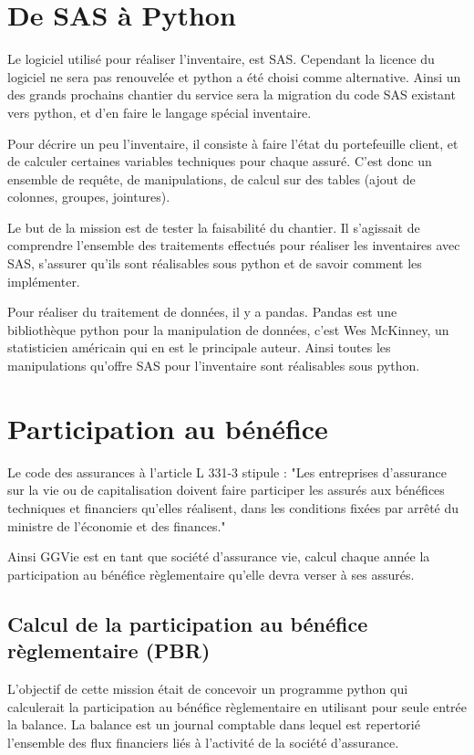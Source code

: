 \chapter{De SAS à Python}

Le logiciel utilisé pour réaliser l'inventaire, est SAS. Cependant la licence du logiciel ne sera pas renouvelée et python a été choisi comme alternative. Ainsi un des grands prochains chantier du service sera la migration du code SAS existant vers python, et d'en faire le langage spécial inventaire.

Pour décrire un peu l'inventaire, il consiste à faire l'état du portefeuille client, et de calculer certaines variables techniques pour chaque assuré. C'est donc un ensemble de requête, de manipulations, de calcul sur des tables (ajout de colonnes, groupes, jointures). 

Le but de la mission est de tester la faisabilité du chantier. Il s’agissait de comprendre l’ensemble des traitements effectués pour réaliser les inventaires avec SAS, s'assurer qu'ils sont réalisables sous python et de savoir comment les implémenter. 

Pour réaliser du traitement de données, il y a pandas. Pandas est une bibliothèque python pour la manipulation de données, c'est Wes McKinney, un statisticien américain qui en est le principale auteur. Ainsi toutes les manipulations qu'offre SAS pour l'inventaire sont réalisables sous python.


\chapter{Participation au bénéfice}

Le code des assurances à l'article L 331-3 stipule :
"Les entreprises d'assurance sur la vie ou de capitalisation doivent faire participer les assurés aux bénéfices techniques et financiers qu'elles réalisent, dans les conditions fixées par arrêté du ministre de l'économie et des finances."

Ainsi GGVie est en tant que société d'assurance vie, calcul chaque année la participation au bénéfice règlementaire qu'elle devra verser à ses assurés.

\section{Calcul de la participation au bénéfice règlementaire (PBR)}

L'objectif de cette mission était de concevoir un programme python qui calculerait la participation au bénéfice règlementaire en utilisant pour seule entrée la balance.
La balance est un journal comptable dans lequel est repertorié l'ensemble des flux financiers liés à l'activité de la société d'assurance.

